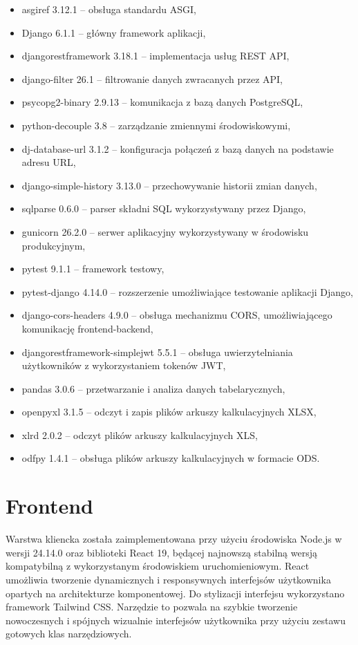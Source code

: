\documentclass[12pt]{book}
\begin{document}
\begin{itemize}
    \item asgiref 3.12.1 -- obsługa standardu ASGI,
    \item Django 6.1.1 -- główny framework aplikacji,
    \item djangorestframework 3.18.1 -- implementacja usług REST API,
    \item django-filter 26.1 -- filtrowanie danych zwracanych przez API,
    \item psycopg2-binary 2.9.13 -- komunikacja z bazą danych PostgreSQL,
    \item python-decouple 3.8 -- zarządzanie zmiennymi środowiskowymi,
    \item dj-database-url 3.1.2 -- konfiguracja połączeń z bazą danych na podstawie adresu URL,
    \item django-simple-history 3.13.0 -- przechowywanie historii zmian danych,
    \item sqlparse 0.6.0 -- parser składni SQL wykorzystywany przez Django,
    \item gunicorn 26.2.0 -- serwer aplikacyjny wykorzystywany w środowisku produkcyjnym,
    \item pytest 9.1.1 -- framework testowy,
    \item pytest-django 4.14.0 -- rozszerzenie umożliwiające testowanie aplikacji Django,
    \item django-cors-headers 4.9.0 -- obsługa mechanizmu CORS, umożliwiającego komunikację frontend-backend,
    \item djangorestframework-simplejwt 5.5.1 -- obsługa uwierzytelniania użytkowników z wykorzystaniem tokenów JWT,
    \item pandas 3.0.6 -- przetwarzanie i analiza danych tabelarycznych,
    \item openpyxl 3.1.5 -- odczyt i zapis plików arkuszy kalkulacyjnych XLSX,
    \item xlrd 2.0.2 -- odczyt plików arkuszy kalkulacyjnych XLS,
    \item odfpy 1.4.1 -- obsługa plików arkuszy kalkulacyjnych w formacie ODS.
\end{itemize}

\section{Frontend}

Warstwa kliencka została zaimplementowana przy użyciu środowiska Node.js w wersji 24.14.0 oraz biblioteki React 19,
będącej najnowszą stabilną wersją kompatybilną z wykorzystanym środowiskiem uruchomieniowym. React umożliwia tworzenie dynamicznych i responsywnych interfejsów użytkownika opartych na architekturze komponentowej.
Do stylizacji interfejsu wykorzystano framework Tailwind CSS. Narzędzie to pozwala na szybkie tworzenie nowoczesnych i spójnych wizualnie interfejsów użytkownika przy użyciu zestawu gotowych klas narzędziowych.
\end{document}
